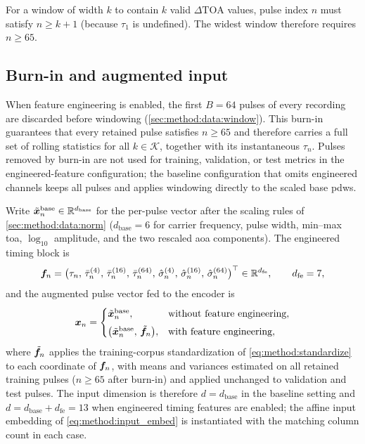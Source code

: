 For a window of width $k$ to contain $k$ valid $\Delta\mathrm{TOA}$ values, pulse index $n$ must satisfy $n \ge k + 1$ (because $\tau_1$ is undefined).
The widest window therefore requires $n \ge 65$.

\subsection{Burn-in and augmented input}\label{sec:method:features:burnin}

When feature engineering is enabled, the first $B = 64$ pulses of every recording are discarded before windowing (\cref{sec:method:data:window}).
This burn-in guarantees that every retained pulse satisfies $n \ge 65$ and therefore carries a full set of rolling statistics for all $k \in \mathcal{K}$, together with its instantaneous $\tau_n$.
Pulses removed by burn-in are not used for training, validation, or test metrics in the engineered-feature configuration; the baseline configuration that omits engineered channels keeps all pulses and applies windowing directly to the scaled base \glspl{pdw}.

Write $\tilde{\bm{x}}^{\mathrm{base}}_n \in \mathbb{R}^{d_{\mathrm{base}}}$ for the per-pulse vector after the scaling rules of \cref{sec:method:data:norm} ($d_{\mathrm{base}} = 6$ for carrier frequency, pulse width, min--max \gls{toa}, $\log_{10}$ amplitude, and the two rescaled \gls{aoa} components).
The engineered timing block is
\begin{equation}\label{eq:method:engineered_block}
  \bm{f}_n
  =
  \bigl(
    \tau_n,\,
    \bar{\tau}^{(4)}_n,\,
    \bar{\tau}^{(16)}_n,\,
    \bar{\tau}^{(64)}_n,\,
    \hat{\sigma}^{(4)}_n,\,
    \hat{\sigma}^{(16)}_n,\,
    \hat{\sigma}^{(64)}_n
  \bigr)^{\top}
  \in \mathbb{R}^{d_{\mathrm{fe}}},
  \qquad
  d_{\mathrm{fe}} = 7,
\end{equation}
and the augmented pulse vector fed to the encoder is
\begin{equation}\label{eq:method:augmented_input}
  \bm{x}_n
  =
  \begin{cases}
    \tilde{\bm{x}}^{\mathrm{base}}_n,
    & \text{without feature engineering}, \\[4pt]
    \bigl(\tilde{\bm{x}}^{\mathrm{base}}_n,\, \tilde{\bm{f}}_n\bigr),
    & \text{with feature engineering},
  \end{cases}
\end{equation}
where $\tilde{\bm{f}}_n$ applies the training-corpus standardization of \cref{eq:method:standardize} to each coordinate of $\bm{f}_n$, with means and variances estimated on all retained training pulses ($n \ge 65$ after burn-in) and applied unchanged to validation and test pulses.
The input dimension is therefore $d = d_{\mathrm{base}}$ in the baseline setting and $d = d_{\mathrm{base}} + d_{\mathrm{fe}} = 13$ when engineered timing features are enabled; the affine input embedding of \cref{eq:method:input_embed} is instantiated with the matching column count in each case.

